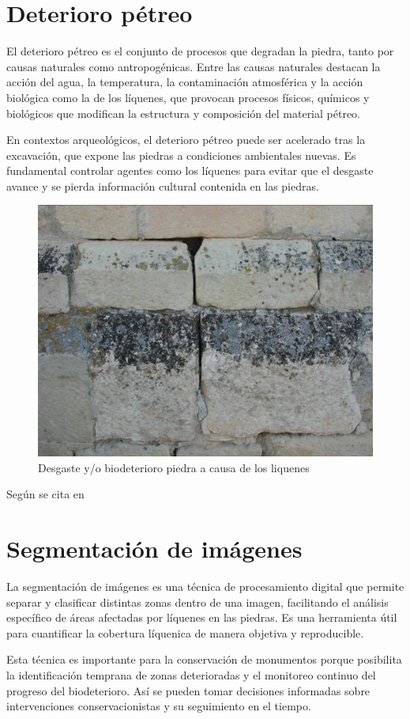 \section{Deterioro pétreo}

El deterioro pétreo es el conjunto de procesos que degradan la piedra, tanto por causas naturales como antropogénicas. Entre las causas naturales destacan la acción del agua, la temperatura, la contaminación atmosférica y la acción biológica como la de los líquenes, que provocan procesos físicos, químicos y biológicos que modifican la estructura y composición del material pétreo.

En contextos arqueológicos, el deterioro pétreo puede ser acelerado tras la excavación, que expone las piedras a condiciones ambientales nuevas. Es fundamental controlar agentes como los líquenes para evitar que el desgaste avance y se pierda información cultural contenida en las piedras.

\begin{figure}[h]
	\centering
	\includegraphics[width=0.5\linewidth]{media/biodeterioro-liquen}
	\caption{Desgaste y/o biodeterioro piedra a causa de los liquenes}
	\label{fig:biodeterioro-liquen}
\end{figure}


Según se cita en \cite{Navarrete2022}

\section{Segmentación de imágenes}

La segmentación de imágenes es una técnica de procesamiento digital que permite separar y clasificar distintas zonas dentro de una imagen, facilitando el análisis específico de áreas afectadas por líquenes en las piedras. Es una herramienta útil para cuantificar la cobertura líquenica de manera objetiva y reproducible. 

Esta técnica es importante para la conservación de monumentos porque posibilita la identificación temprana de zonas deterioradas y el monitoreo continuo del progreso del biodeterioro. Así se pueden tomar decisiones informadas sobre intervenciones conservacionistas y su seguimiento en el tiempo.


